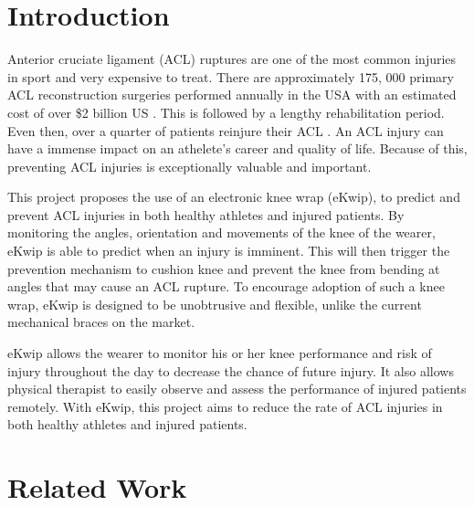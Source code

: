 \documentclass{sig-alternate}
\begin{document}
\section{Introduction}
\label{sec:intro}
Anterior cruciate ligament (ACL) ruptures are one of the most common injuries in sport and very expensive to treat. There are approximately 175, 000 primary ACL reconstruction surgeries performed annually in the USA with an estimated cost of over \$2 billion US \cite{yu2007mechanisms}. This is followed by a lengthy rehabilitation period. Even then, over a quarter of patients reinjure their ACL \cite{stevenson1998gender}. An ACL injury can have a immense impact on an athelete's career and quality of life. Because of this, preventing ACL injuries is exceptionally valuable and important.

This project proposes the use of an electronic knee wrap (eKwip), to predict and prevent ACL injuries in both healthy athletes and injured patients. By monitoring the angles, orientation and movements of the knee of the wearer, eKwip is able to predict when an injury is imminent. This will then trigger the prevention mechanism to cushion knee and prevent the knee from bending at angles that may cause an ACL rupture. To encourage adoption of such a knee wrap, eKwip is designed to be unobtrusive and flexible, unlike the current mechanical braces on the market.

eKwip allows the wearer to monitor his or her knee performance and risk of injury throughout the day to decrease the chance of future injury. It also allows physical therapist to easily observe and assess the performance of injured patients remotely. With eKwip, this project aims to reduce the rate of ACL injuries in both healthy athletes and injured patients.

\section{Related Work}
\label{sec:related_work}

\end{document}
